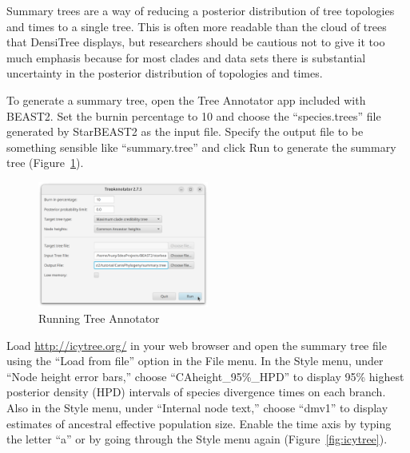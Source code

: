 \documentclass[12pt]{article}
\begin{document}
Summary trees are a way of reducing a posterior distribution of tree
topologies and times to a single tree. This is often more readable than the
cloud of trees that DensiTree displays, but researchers should be cautious not
to give it too much emphasis because for most clades and data
sets there is substantial uncertainty in the posterior distribution of
topologies and times.

To generate a summary tree, open the Tree Annotator app included with BEAST2.
Set the burnin percentage to 10 and choose the ``species.trees'' file generated by
StarBEAST2 as the input file. Specify the output file to be something sensible
like ``summary.tree'' and click Run to generate the summary tree
(Figure~\ref{fig:treeAnnotator}).

\begin{figure}[htb!]
\centering
\includegraphics[width=0.5\textwidth]{figures/treeAnnotator.png}
\caption
{Running Tree Annotator}
\label{fig:treeAnnotator}
\end{figure}

Load \url{http://icytree.org/} in your web browser and open the summary tree file using the ``Load from file'' option in the File menu. In the Style menu, under ``Node height error bars,'' choose ``CAheight\_95\%\_HPD'' to display 95\% highest posterior density (HPD) intervals of species divergence times on each branch. Also in the Style menu, under ``Internal node text,'' choose ``dmv1'' to display estimates of ancestral effective population size. Enable the time axis by typing the letter ``a'' or by going through the Style menu again (Figure~\ref{fig:icytree}).
\end{document}
